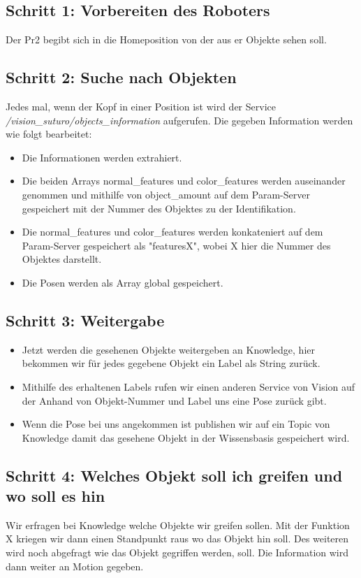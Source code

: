 \documentclass{suturo}
\begin{document}
\subsection*{Schritt 1: Vorbereiten des Roboters}
Der Pr2 begibt sich in die Homeposition von der aus er Objekte sehen soll. 

\subsection*{Schritt 2: Suche nach Objekten}
Jedes mal, wenn der Kopf in einer Position ist wird der Service \textit{/vision\_suturo/objects\_information} aufgerufen. Die gegeben Information werden wie folgt bearbeitet:

\begin{itemize} 
\item Die Informationen werden extrahiert.
\item Die beiden Arrays normal\_features und color\_features werden auseinander genommen und mithilfe von object\_amount auf dem Param-Server gespeichert mit der Nummer des Objektes zu der Identifikation.
\item Die normal\_features und color\_features werden konkateniert auf dem Param-Server gespeichert als "featuresX", wobei X hier die Nummer des Objektes darstellt.
\item Die Posen werden als Array global gespeichert.
\end{itemize}


\subsection*{Schritt 3: Weitergabe} 

\begin{itemize} 
\item Jetzt werden die gesehenen Objekte weitergeben an Knowledge, hier bekommen wir für jedes gegebene Objekt ein Label als String zurück.
\item Mithilfe des erhaltenen Labels rufen wir einen anderen Service von Vision auf der Anhand von Objekt-Nummer und Label uns eine Pose zurück gibt.  
\item Wenn die Pose bei uns angekommen ist publishen wir auf ein Topic von Knowledge damit das gesehene Objekt in der Wissensbasis gespeichert wird.
\end{itemize}



\subsection*{Schritt 4: Welches Objekt soll ich greifen und wo soll es hin}
Wir erfragen bei Knowledge welche Objekte wir greifen sollen. %
Mit der Funktion X kriegen wir dann einen Standpunkt raus wo das Objekt hin soll. %
Des weiteren wird noch abgefragt wie das Objekt gegriffen werden, soll. Die Information wird dann weiter an Motion gegeben.
\end{document}
